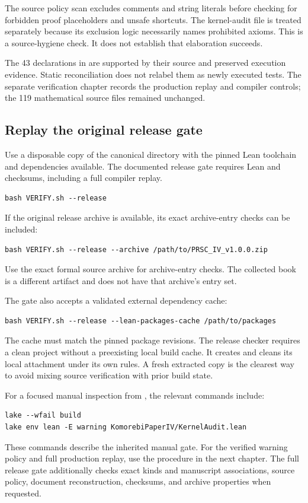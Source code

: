 The source policy scan excludes comments and string literals before checking for forbidden proof placeholders and unsafe shortcuts. The kernel-audit file is treated separately because its exclusion logic necessarily names prohibited axioms. This is a source-hygiene check. It does not establish that elaboration succeeds.

The 43 declarations in  are supported by their source and preserved execution evidence. Static reconciliation does not relabel them as newly executed tests. The separate verification chapter records the production replay and compiler controls; the 119 mathematical source files remained unchanged.

\subsection{Replay the original release gate}
Use a disposable copy of the canonical  directory with the pinned Lean toolchain and dependencies available. The documented release gate requires Lean and checksums, including a full compiler replay.
\begin{Verbatim}[fontsize=\small,breaklines=true,breakanywhere=true]
bash VERIFY.sh --release
\end{Verbatim}
If the original release archive is available, its exact archive-entry checks can be included:
\begin{Verbatim}[fontsize=\small,breaklines=true,breakanywhere=true]
bash VERIFY.sh --release --archive /path/to/PRSC_IV_v1.0.0.zip
\end{Verbatim}
Use the exact formal source archive for archive-entry checks. The collected book is a different artifact and does not have that archive's entry set.

The gate also accepts a validated external dependency cache:
\begin{Verbatim}[fontsize=\small,breaklines=true,breakanywhere=true]
bash VERIFY.sh --release --lean-packages-cache /path/to/packages
\end{Verbatim}
The cache must match the pinned package revisions. The release checker requires a clean project without a preexisting local build cache. It creates and cleans its local attachment under its own rules. A fresh extracted copy is the clearest way to avoid mixing source verification with prior build state.

For a focused manual inspection from , the relevant commands include:
\begin{Verbatim}[fontsize=\small,breaklines=true,breakanywhere=true]
lake --wfail build
lake env lean -E warning KomorebiPaperIV/KernelAudit.lean
\end{Verbatim}
These commands describe the inherited manual gate. For the verified warning policy and full production replay, use the procedure in the next chapter. The full release gate additionally checks exact kinds and manuscript associations, source policy, document reconstruction, checksums, and archive properties when requested.

